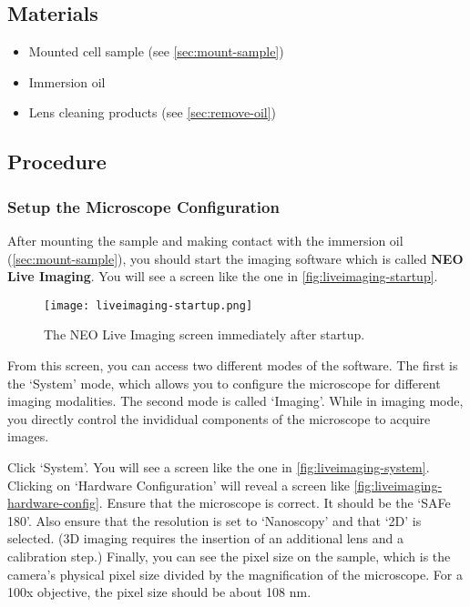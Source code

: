 \documentclass[10pt,a4paper,oneside]{book}
\begin{document}
\subsection{Materials}

\begin{itemize}
    \item{Mounted cell sample (see \autoref{sec:mount-sample})}
    \item{Immersion oil}
    \item{Lens cleaning products (see \autoref{sec:remove-oil})}
\end{itemize}

\subsection{Procedure}

\subsubsection{Setup the Microscope Configuration}

After mounting the sample and making contact with the immersion oil (\autoref{sec:mount-sample}), you should start the imaging software which is called \textbf{NEO Live Imaging}. You will see a screen like the one in \autoref{fig:liveimaging-startup}.

\begin{figure}[ht]
    \centering
    \texttt{[image: liveimaging-startup.png]}
    \caption{The NEO Live Imaging screen immediately after startup.}
    \label{fig:liveimaging-startup}
\end{figure}

From this screen, you can access two different modes of the software. The first is the `System' mode, which allows you to configure the microscope for different imaging modalities. The second mode is called `Imaging'. While in imaging mode, you directly control the invididual components of the microscope to acquire images.

Click `System'. You will see a screen like the one in \autoref{fig:liveimaging-system}. Clicking on `Hardware Configuration' will reveal a screen like \autoref{fig:liveimaging-hardware-config}. Ensure that the microscope is correct. It should be the `SAFe 180'. Also ensure that the resolution is set to `Nanoscopy' and that `2D' is selected. (3D imaging requires the insertion of an additional lens and a calibration step.) Finally, you can see the pixel size on the sample, which is the camera's physical pixel size divided by the magnification of the microscope. For a 100x objective, the pixel size should be about 108 nm.
\end{document}
